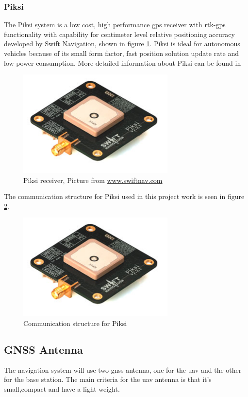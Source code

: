 \subsubsection{Piksi}\label{ss:Piksi}
The Piksi system is a low cost, high performance \gls{gps} receiver with \gls{rtk-gps} functionality with capability for centimeter level relative positioning accuracy developed by Swift Navigation, shown in figure \ref{figure:Piksi}. Piksi is ideal for autonomous vehicles because of its small form factor, fast position solution update rate and low power consumption. 
More detailed information about Piksi can be found in \citep{Piksiv231}
\begin{figure}[H]
	\centering
		\includegraphics[width=0.7\textwidth]{figs/piksi_top.jpg}
		\caption{Piksi receiver, Picture from \url{www.swiftnav.com}}
		\label{figure:Piksi}
\end{figure}
The communication structure for Piksi used in this project work is seen in figure \ref{figure:CommunicationPiksi}.
\begin{figure}[H]
	\centering
		\includegraphics[width=0.7\textwidth]{figs/piksi_top.jpg}
		\caption{Communication structure for Piksi}
		\label{figure:CommunicationPiksi}
\end{figure}
\subsection{GNSS Antenna}
The navigation system will use two \gls{gnss} antenna, one for the \gls{uav} and the other for the base station. The main criteria for the \gls{uav} antenna is that it's small,compact and have a light weight.

